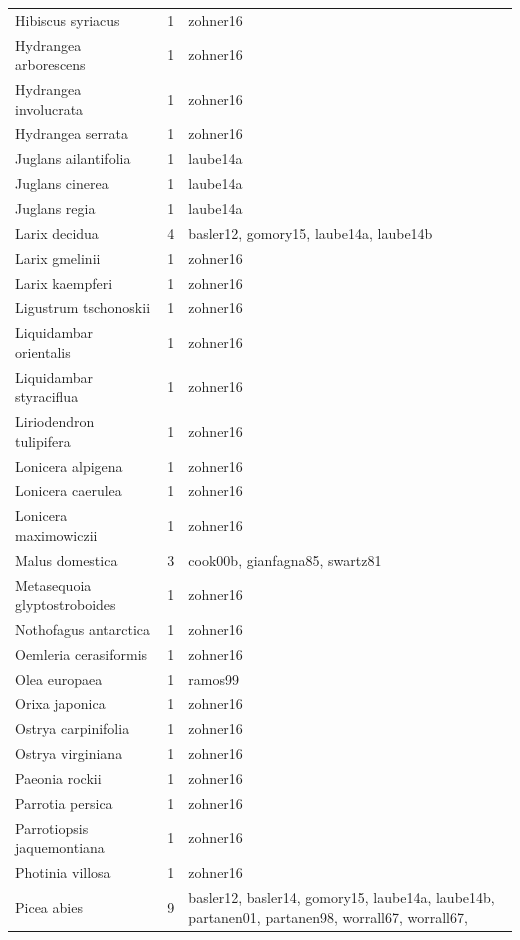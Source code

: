 \documentclass{article}
\begin{document}
\begin{footnotesize}
\begin{longtable}{|p{}|p{}|p{}|}
  Hibiscus syriacus &   1 & zohner16 \\ 
  Hydrangea arborescens &   1 & zohner16 \\ 
  Hydrangea involucrata &   1 & zohner16 \\ 
  Hydrangea serrata &   1 & zohner16 \\ 
  Juglans ailantifolia &   1 & laube14a \\ 
  Juglans cinerea &   1 & laube14a \\ 
  Juglans regia &   1 & laube14a \\ 
  Larix decidua &   4 & basler12, gomory15, laube14a, laube14b \\ 
  Larix gmelinii &   1 & zohner16 \\ 
  Larix kaempferi &   1 & zohner16 \\ 
  Ligustrum tschonoskii &   1 & zohner16 \\ 
  Liquidambar orientalis &   1 & zohner16 \\ 
  Liquidambar styraciflua &   1 & zohner16 \\ 
  Liriodendron tulipifera &   1 & zohner16 \\ 
  Lonicera alpigena &   1 & zohner16 \\ 
  Lonicera caerulea &   1 & zohner16 \\ 
  Lonicera maximowiczii &   1 & zohner16 \\ 
  Malus domestica &   3 & cook00b, gianfagna85, swartz81 \\ 
  Metasequoia glyptostroboides &   1 & zohner16 \\ 
  Nothofagus antarctica &   1 & zohner16 \\ 
  Oemleria cerasiformis &   1 & zohner16 \\ 
  Olea europaea &   1 & ramos99 \\ 
  Orixa japonica &   1 & zohner16 \\ 
  Ostrya carpinifolia &   1 & zohner16 \\ 
  Ostrya virginiana &   1 & zohner16 \\ 
  Paeonia rockii &   1 & zohner16 \\ 
  Parrotia persica &   1 & zohner16 \\ 
  Parrotiopsis jaquemontiana &   1 & zohner16 \\ 
  Photinia villosa &   1 & zohner16 \\ 
  Picea abies &   9 & basler12, basler14, gomory15, laube14a, laube14b, partanen01, partanen98, worrall67, worrall67,  \\ 

\end{longtable}
\end{footnotesize}
\end{document}

